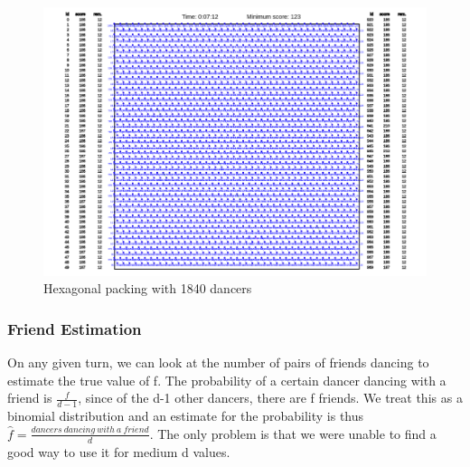 \begin{figure}[h]
\center
\includegraphics[scale=0.5]{hex.png}
\caption{Hexagonal packing with 1840 dancers}
\label{fig:Hexagonal Packing}
\end{figure}
\subsubsection{Friend Estimation}
On any given turn, we can look at the number of pairs of friends dancing to estimate the true value of f. The probability of a certain dancer dancing with a friend is $\frac{f}{d-1}$, since of the d-1 other dancers, there are f friends. We treat this as a binomial distribution and an estimate for the probability is thus $\hat{f} = \frac{dancers\ dancing\ with\ a\ friend}{d}$. The only problem is that we were unable to find a good way to use it for medium d values.\\